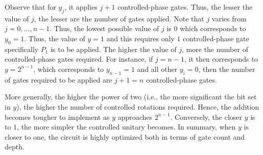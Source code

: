 \begin{remark}
    Observe that for $y_j$, it applies $j+1$ controlled-phase gates. Thus, the lesser the value of $j$, the lesser are the number of gates applied. Note that $j$ varies from $j=0,\ldots,n-1$. Thus, the lowest possible value of $j$ is $0$ which corresponds to $y_0=1$. Thus, the value of $y=1$ and this requires only $1$ controlled-phase gate specifically $P_1$ is to be applied. The higher the value of $j$, more the number of controlled-phase gates required. For instance, if $j=n-1$, it then corresponds to \( y = 2^{n-1} \), which corresponds to \( y_{n-1} = 1 \) and all other \( y_i = 0 \), then the number of gates required to be applied are $j+1=n$ controlled-phase gates.

    More generally, the higher the power of two (i.e., the more significant the bit set in \( y \)), the higher the number of controlled rotations required. Hence, the addition becomes tougher to implement as \( y \) approaches \( 2^{n-1} \). Conversely, the closer \( y \) is to \( 1 \), the more simpler the controlled unitary becomes. In summary, when \( y \) is closer to one, the circuit is highly optimized both in terms of gate count and depth.
\end{remark}



